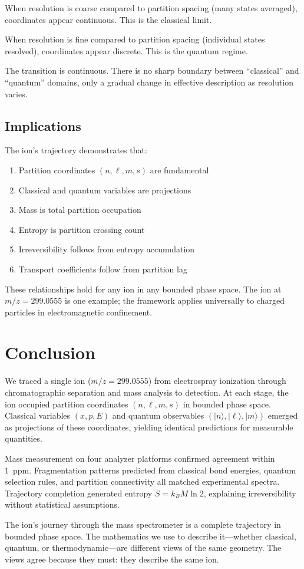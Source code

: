 \documentclass[twocolumn,10pt]{article}
\theoremstyle{remark}
\begin{document}
When resolution is coarse compared to partition spacing (many states averaged), coordinates appear continuous. This is the classical limit.

When resolution is fine compared to partition spacing (individual states resolved), coordinates appear discrete. This is the quantum regime.

The transition is continuous. There is no sharp boundary between ``classical'' and ``quantum'' domains, only a gradual change in effective description as resolution varies.

\subsection{Implications}

The ion's trajectory demonstrates that:
\begin{enumerate}
    \item Partition coordinates $(n, \ell, m, s)$ are fundamental
    \item Classical and quantum variables are projections
    \item Mass is total partition occupation
    \item Entropy is partition crossing count
    \item Irreversibility follows from entropy accumulation
    \item Transport coefficients follow from partition lag
\end{enumerate}

These relationships hold for any ion in any bounded phase space. The ion at $m/z = 299.0555$ is one example; the framework applies universally to charged particles in electromagnetic confinement.


\section{Conclusion}
\label{sec:conclusion}

We traced a single ion ($m/z = 299.0555$) from electrospray ionization through chromatographic separation and mass analysis to detection. At each stage, the ion occupied partition coordinates $(n, \ell, m, s)$ in bounded phase space. Classical variables $(x, p, E)$ and quantum observables $(|n\rangle, |\ell\rangle, |m\rangle)$ emerged as projections of these coordinates, yielding identical predictions for measurable quantities.

Mass measurement on four analyzer platforms confirmed agreement within 1~ppm. Fragmentation patterns predicted from classical bond energies, quantum selection rules, and partition connectivity all matched experimental spectra. Trajectory completion generated entropy $S = k_B M \ln 2$, explaining irreversibility without statistical assumptions.

The ion's journey through the mass spectrometer is a complete trajectory in bounded phase space. The mathematics we use to describe it---whether classical, quantum, or thermodynamic---are different views of the same geometry. The views agree because they must: they describe the same ion.




\end{document}
